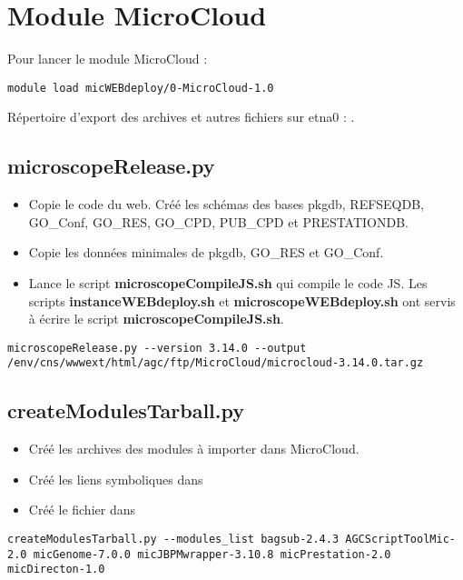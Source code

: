\section {Module MicroCloud}

Pour lancer le module MicroCloud :
\begin{lstlisting}[style=bash]
module load micWEBdeploy/0-MicroCloud-1.0
\end{lstlisting}

Répertoire d'export des archives et autres fichiers sur etna0 : .

\subsection{microscopeRelease.py}
\begin{itemize}
\item Copie le code du web.
Créé les schémas des bases pkgdb, REFSEQDB, GO\_Conf, GO\_RES, GO\_CPD, PUB\_CPD et PRESTATIONDB.
\item Copie les données minimales de pkgdb, GO\_RES et GO\_Conf.
\item Lance le script \textbf{microscopeCompileJS.sh} qui compile le code JS. Les scripts \textbf{instanceWEBdeploy.sh} et \textbf{microscopeWEBdeploy.sh} ont servis à écrire le script \textbf{microscopeCompileJS.sh}.
\end{itemize}
\begin{lstlisting}[style=bash]
microscopeRelease.py --version 3.14.0 --output /env/cns/wwwext/html/agc/ftp/MicroCloud/microcloud-3.14.0.tar.gz
\end{lstlisting}

\subsection{createModulesTarball.py}
\begin{itemize}
\item Créé les archives des modules à importer dans MicroCloud.
\item Créé les liens symboliques dans 
\item Créé le fichier  dans 
\end{itemize}

\begin{lstlisting}[style=bash]
createModulesTarball.py --modules_list bagsub-2.4.3 AGCScriptToolMic-2.0 micGenome-7.0.0 micJBPMwrapper-3.10.8 micPrestation-2.0 micDirecton-1.0
\end{lstlisting}
\bigskip

